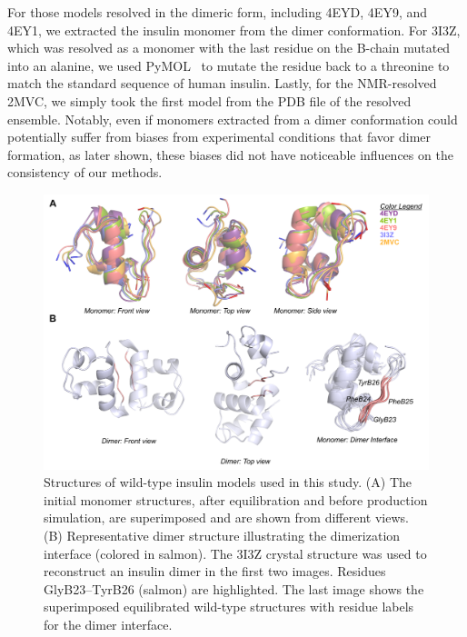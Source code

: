 \documentclass[sn-vancouver]{sn-jnl}
\begin{document}
For those models resolved in the dimeric form, including 4EYD, 4EY9, and 4EY1, we extracted the insulin monomer from the dimer conformation. For 3I3Z, which was resolved as a monomer with the last residue on the B-chain mutated into an alanine, we used PyMOL~\cite{delano2002pymol} to mutate the residue back to a threonine to match the standard sequence of human insulin. Lastly, for the NMR-resolved 2MVC, we simply took the first model from the PDB file of the resolved ensemble. Notably, even if monomers extracted from a dimer conformation could potentially suffer from biases from experimental conditions that favor dimer formation, as later shown, these biases did not have noticeable influences on the consistency of our methods. 

\begin{figure}[H]
\centering
\includegraphics[width=\textwidth]{Figures/Fig_WTmodels_dimerInterface.png}
\caption{Structures of wild-type insulin models used in this study. (A) The initial monomer structures, after equilibration and before production simulation, are superimposed and are shown from different views. (B) Representative dimer structure illustrating the dimerization interface (colored in salmon). The 3I3Z crystal structure was used to reconstruct an insulin dimer in the first two images. Residues GlyB23--TyrB26 (salmon) are highlighted. The last image shows the superimposed equilibrated wild-type structures with residue labels for the dimer interface.}
\label{starting_structures}
\end{figure}
\end{document}
